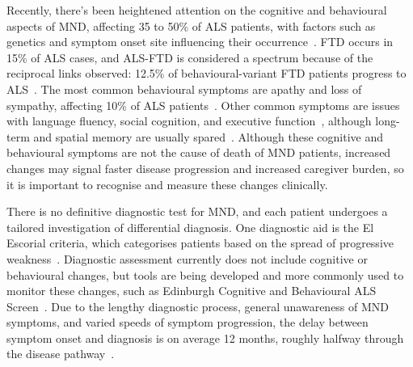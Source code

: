 Recently, there's been heightened attention on the cognitive and behavioural aspects of MND, affecting 35 to 50\% of ALS patients, with factors such as genetics and symptom onset site influencing their occurrence~\cite{yangRiskFactorsCognitive2021, chioALSPhenotypeInfluenced2020}.
FTD occurs in 15\% of ALS cases, and ALS-FTD is considered a spectrum because of the reciprocal links observed: 12.5\% of behavioural-variant FTD patients progress to ALS~\cite{strongAmyotrophicLateralSclerosis2017}.
The most common behavioural symptoms are apathy and loss of sympathy,  affecting 10\% of ALS patients~\cite{abrahamsScreeningCognitionBehaviour2014}.
Other common symptoms are issues with language fluency, social cognition, and executive function~\cite{beeldmanCognitiveProfileALS2016}, although long-term and spatial memory are usually spared~\cite{crockfordALSspecificCognitiveBehavior2018}.
Although these cognitive and behavioural symptoms are not the cause of death of MND patients, increased changes may signal faster disease progression and increased caregiver burden, so it is important to recognise and measure these changes clinically.

There is no definitive diagnostic test for MND, and each patient undergoes a tailored investigation of differential diagnosis.
One diagnostic aid is the El Escorial criteria, which categorises patients based on the spread of progressive weakness~\cite{ludolphRevisionEscorialCriteria2015}.
Diagnostic assessment currently does not include cognitive or behavioural changes, but tools are being developed and more commonly used to monitor these changes, such as Edinburgh Cognitive and Behavioural ALS Screen~\cite{abrahamsScreeningCognitionBehaviour2014}.
Due to the lengthy diagnostic process, general unawareness of MND symptoms, and varied speeds of symptom progression, the delay between symptom onset and diagnosis is on average 12 months, roughly halfway through the disease pathway~\cite{mitchellTimelinesDiagnosticEvaluation2010}.

